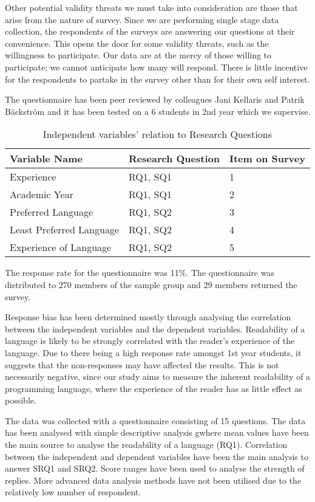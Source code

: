 \documentclass[times, 10pt,twocolumn]{Article}
\begin{document}
Other potential validity threats we must take into consideration are those that arise from the nature of survey. Since we are performing single stage data collection, the respondents of the surveys are answering our questions at their convenience. This opens the door for some validity threats, such as the willingness to participate. Our data are at the mercy of those willing to participate; we cannot anticipate how many will respond. There is little incentive for the respondents to partake in the survey other than for their own self interest. 

The questionnaire has been peer reviewed by colleagues Jani Kellaris and Patrik Bäckström and it has been tested on a 6 students in 2nd year which we supervise. 

\begin{table}[ht]
  \centering
  \begin{tabularx}
  {\linewidth}{| l | X | X |}
    \hline
    \textbf{Variable Name} & \textbf{Research Question} & \textbf{Item on Survey} \\ \hline
    Experience & RQ1, SQ1 & 1 \\ \hline
    Academic Year & RQ1, SQ1 & 2 \\ \hline
    Preferred Language & RQ1, SQ2 & 3 \\ \hline
    Least Preferred Language & RQ1, SQ2& 4 \\  \hline
    Experience of Language & RQ1, SQ2 & 5 \\ 
    \hline
  \end{tabularx}
  \caption{Independent variables' relation to Research Questions}
\end{table}

The response rate for the questionnaire was 11\%. The questionnaire was distributed to 270 members of the sample group and 29 members returned the survey.

Response bias has been determined mostly through analysing the correlation between the independent variables and the dependent variables. Readability of a language is likely to be strongly correlated with the reader's experience of the language. Due to there being a high response rate amongst 1st year students, it suggests that the non-responses may have affected the results. This is not necessarily negative, since our study aims to measure the inherent readability of a programming language, where the experience of the reader has as little effect as possible.

The data was collected with a questionnaire consisting of 15 questions. The data has been analysed with simple descriptive analysis gwhere mean values have been the main source to analyse the readability of a language (RQ1). Correlation between the independent and dependent variables have been the main analysis to answer SRQ1 and SRQ2. Score ranges have been used to analyse the strength of replies. More advanced data analysis methods have not been utilised due to the relatively low number of respondent. 
\end{document}
